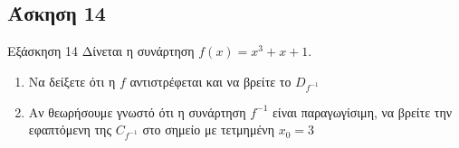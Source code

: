 \documentclass[greek]{beamer}
\begin{document}
\subsection{Άσκηση 14}
\begin{frame}[label=Άσκηση14]{Εξάσκηση 14}
 Δίνεται η συνάρτηση $f(x)=x^3+x+1$.
 \begin{enumerate}
  \item<1-> Να δείξετε ότι η $f$ αντιστρέφεται και να βρείτε το $D_{f^{-1}}$
  \item<2-> Αν θεωρήσουμε γνωστό ότι η συνάρτηση $f^{-1}$ είναι παραγωγίσιμη, να βρείτε την εφαπτόμενη της $C_{f^{-1}}$ στο σημείο με τετμημένη $x_0=3$
 \end{enumerate}


\end{frame}
\end{document}

